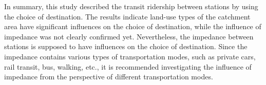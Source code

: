 %
In summary, this study described the transit ridership between stations by using the choice of destination. The results indicate land-use types of the catchment area have significant influences on the choice of destination, while the influence of impedance was not clearly confirmed yet. Nevertheless, the impedance between stations is supposed to have influences on the choice of destination. Since the impedance contains various types of transportation modes, such as private cars, rail transit, bus, walking, etc., it is recommended investigating the influence of impedance from the perspective of different transportation modes.


\clearpage %

% 
